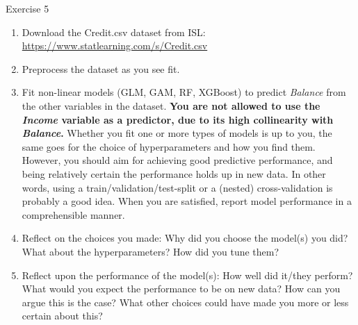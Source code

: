 \begin{frame}{Exercise 5}
\scriptsize\selectfont


\begin{enumerate}
    \item Download the Credit.csv dataset from ISL: \url{https://www.statlearning.com/s/Credit.csv}
    \item Preprocess the dataset as you see fit.
    \item Fit non-linear models (GLM, GAM, RF, XGBoost) to predict \textit{Balance} from the other variables in the dataset. \textbf{You are not allowed to use the \textit{Income} variable as a predictor, due to its high collinearity with \textit{Balance}.} Whether you fit one or more types of models is up to you, the same goes for the choice of hyperparameters and how you find them. However, you should aim for achieving good predictive performance, and being relatively certain the performance holds up in new data. In other words, using a train/validation/test-split or a (nested) cross-validation is probably a good idea. When you are satisfied, report model performance in a comprehensible manner.
    \item Reflect on the choices you made: Why did you choose the model(s) you did? What about the hyperparameters? How did you tune them?
    \item Reflect upon the performance of the model(s): How well did it/they perform? What would you expect the performance to be on new data? How can you argue this is the case? What other choices could have made you more or less certain about this?
\end{enumerate}

\end{frame}
